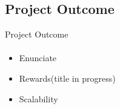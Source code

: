     \subsection{Project Outcome}
    \begin{frame}{Project Outcome}\framesubtitle{}   
        \begin{itemize}
            \item Enunciate
            \item Rewards(title in progress)
            \item Scalability
        \end{itemize}
    \end{frame}

